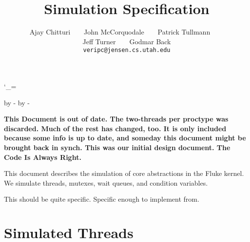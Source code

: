 %
%

     

\catcode`\_=\active 

\long{}
\long{}
\def\classHeader#1#2#3{{\large\noindent {\sc Patrick Tullmann} \hfill #1
\newline {\bf #2} \hfill #3\newline \hrule}}


\topmargin 0pt
\advance \topmargin by -\headheight
\advance \topmargin by -\headsep
\textheight 8.9in
\oddsidemargin 0.3in  
\evensidemargin \oddsidemargin
\marginparwidth 0.5in
\textwidth 6in

\title{{\Large \bf Simulation Specification}}

\author{Ajay Chitturi~~~~John McCorquodale~~~~Patrick Tullmann~~~~\\
        Jeff Turner~~~~Godmar Back \\[2ex]
        {\tt veripc@jensen.cs.utah.edu}
        }



\maketitle

{\bf {\LARGE 
This Document is out of date.  The two-threads per 
proctype was discarded.  Much of the rest has changed, too.
It is only included because some info is up to date, and someday
this document might be brought back in synch.  This was our
initial design document.  The Code Is Always Right.
}}

This document describes the simulation of core abstractions in the
Fluke kernel.  We simulate threads, mutexes, wait queues, and
condition variables.

This should be quite specific.  Specific enough to implement from.

\section{Simulated Threads}

